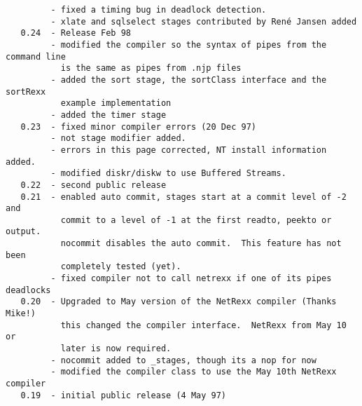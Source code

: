 \begin{verbatim}
         - fixed a timing bug in deadlock detection.
         - xlate and sqlselect stages contributed by René Jansen added
   0.24  - Release Feb 98
         - modified the compiler so the syntax of pipes from the command line
           is the same as pipes from .njp files
         - added the sort stage, the sortClass interface and the sortRexx
           example implementation
         - added the timer stage
   0.23  - fixed minor compiler errors (20 Dec 97)
         - not stage modifier added.
         - errors in this page corrected, NT install information added.
         - modified diskr/diskw to use Buffered Streams.
   0.22  - second public release
   0.21  - enabled auto commit, stages start at a commit level of -2 and
           commit to a level of -1 at the first readto, peekto or output.
           nocommit disables the auto commit.  This feature has not been
           completely tested (yet).
         - fixed compiler not to call netrexx if one of its pipes deadlocks
   0.20  - Upgraded to May version of the NetRexx compiler (Thanks Mike!)
           this changed the compiler interface.  NetRexx from May 10 or
           later is now required.
         - nocommit added to _stages, though its a nop for now
         - modified the compiler class to use the May 10th NetRexx compiler
   0.19  - initial public release (4 May 97)
\end{verbatim}